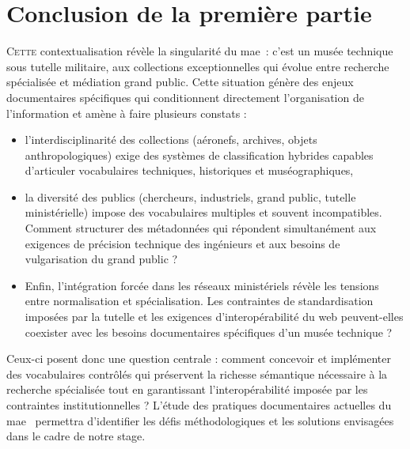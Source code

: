 \documentclass[12pt,twoside]{book}
\newcommand{\mae}{\ac{mae}} %
\newcommand{\maelong}{\acf{mae}} %
\begin{document}
	
	 
	
	
	
	\section*{Conclusion de la première partie}
	
	\lettrine{C}{ette} contextualisation révèle la singularité du \maelong~: c'est un musée technique sous tutelle militaire, aux collections exceptionnelles qui évolue entre recherche spécialisée et médiation grand public. Cette situation génère des enjeux documentaires spécifiques qui conditionnent directement l'organisation de l'information et amène à faire plusieurs constats : 
	\begin{itemize}
		\item l'interdisciplinarité des collections (aéronefs, archives, objets anthropologiques) exige des systèmes de classification hybrides capables d'articuler vocabulaires techniques, historiques et muséographiques,
		\item la diversité des publics (chercheurs, industriels, grand public, tutelle ministérielle) impose des vocabulaires multiples et souvent incompatibles. Comment structurer des métadonnées qui répondent simultanément aux exigences de précision technique des ingénieurs et aux besoins de vulgarisation du grand public ?
		\item Enfin, l'intégration forcée dans les réseaux ministériels révèle les tensions entre normalisation et spécialisation. Les contraintes de standardisation imposées par la tutelle et les exigences d'interopérabilité du web peuvent-elles coexister avec les besoins documentaires spécifiques d'un musée technique ?
	\end{itemize}
	
	Ceux-ci posent donc une question centrale : comment concevoir et implémenter des vocabulaires contrôlés qui préservent la richesse sémantique nécessaire à la recherche spécialisée tout en garantissant l'interopérabilité imposée par les contraintes institutionnelles ? L'étude des pratiques documentaires actuelles du \mae~ permettra d'identifier les défis méthodologiques et les solutions envisagées dans le cadre de notre stage.
	
	
\end{document}
